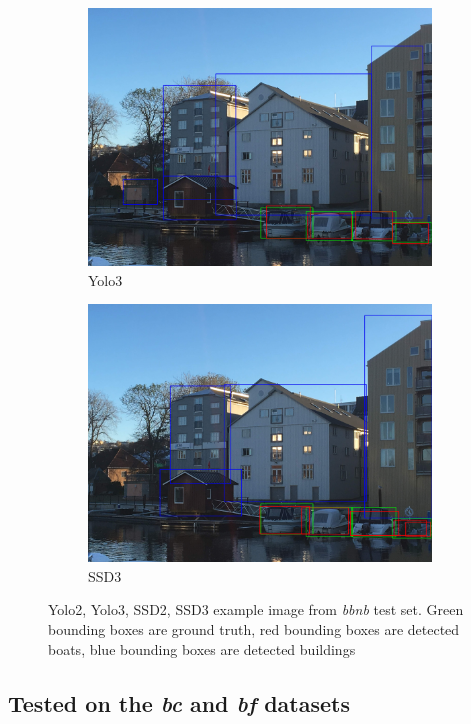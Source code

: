 \begin{figure}[h!]
\begin{subfigure}{.5\textwidth}
  \centering
  \includegraphics[width=0.8\linewidth]{results/case_buildings/prec_recall/yolo/IMG_2077_build.jpg}
  \caption{Yolo3}
  \label{fig:ex_bbnb_yolo3}
\end{subfigure}%
\begin{subfigure}{.5\textwidth}
  \centering
  \includegraphics[width=.8\linewidth]{results/case_buildings/prec_recall/ssd/IMG_2077_build.jpg}
  \caption{SSD3}
  \label{fig:ex_bbnb_ssd3}
\end{subfigure}
\caption{Yolo2, Yolo3, SSD2, SSD3 example image from \textit{bbnb} test set. Green bounding boxes are ground truth, red bounding boxes are detected boats, blue bounding boxes are detected buildings}
\label{img:bbnb_ex}
\end{figure}

\newpage

\subsection{Tested on the \textit{bc} and \textit{bf} datasets}

